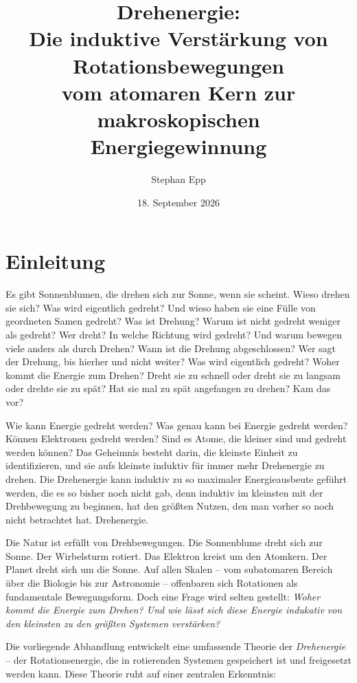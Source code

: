 \documentclass[12pt,a4paper]{report}
\title{\textbf{Drehenergie: \\ Die induktive Verstärkung von Rotationsbewegungen \\ vom atomaren Kern zur makroskopischen Energiegewinnung}}
\author{Stephan Epp}
\date{18. September 2026}
\theoremstyle{plain}
\theoremstyle{definition}
\theoremstyle{remark}
\begin{document}
\maketitle	
\tableofcontents
\newpage

\chapter{Einleitung}
Es gibt Sonnenblumen, die drehen sich zur Sonne, wenn sie scheint. Wieso drehen sie sich? Was wird eigentlich gedreht? Und wieso haben sie eine Fülle von geordneten Samen gedreht? Was ist Drehung? Warum ist nicht gedreht weniger als gedreht? Wer dreht? In welche Richtung wird gedreht? Und warum bewegen viele anders als durch Drehen? Wann ist die Drehung abgeschlossen? Wer sagt der Drehung, bis hierher und nicht weiter? Was wird eigentlich gedreht? Woher kommt die Energie zum Drehen? Dreht sie zu schnell oder dreht sie zu langsam oder drehte sie zu spät? Hat sie mal zu spät angefangen zu drehen? Kam das vor? 

Wie kann Energie gedreht werden? Was genau kann bei Energie gedreht werden? Können Elektronen gedreht werden? Sind es Atome, die kleiner sind und gedreht werden können? Das Geheimnis besteht darin, die kleinste Einheit zu identifizieren, und sie aufs kleinste induktiv für immer mehr Drehenergie zu drehen. Die Drehenergie kann induktiv zu so maximaler Energieausbeute geführt werden, die es so bisher noch nicht gab, denn induktiv im kleinsten mit der Drehbewegung zu beginnen, hat den größten Nutzen, den man vorher so noch nicht betrachtet hat. Drehenergie.

Die Natur ist erfüllt von Drehbewegungen. Die Sonnenblume dreht sich zur Sonne. Der Wirbelsturm rotiert. Das Elektron kreist um den Atomkern. Der Planet dreht sich um die Sonne. Auf allen Skalen -- vom subatomaren Bereich über die Biologie bis zur Astronomie -- offenbaren sich Rotationen als fundamentale Bewegungsform. Doch eine Frage wird selten gestellt: \emph{Woher kommt die Energie zum Drehen? Und wie lässt sich diese Energie indukativ von den kleinsten zu den größten Systemen verstärken?}

Die vorliegende Abhandlung entwickelt eine umfassende Theorie der \emph{Drehenergie} -- der Rotationsenergie, die in rotierenden Systemen gespeichert ist und freigesetzt werden kann. Diese Theorie ruht auf einer zentralen Erkenntnis:
\end{document}

